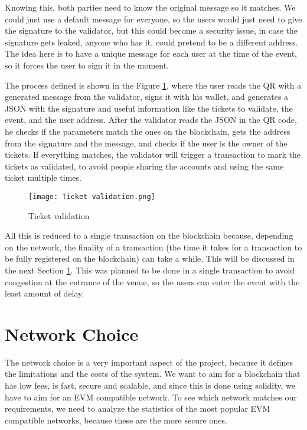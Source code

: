 Knowing this, both parties need to know the original message so it matches. We could just use a default message for everyone, so the users would just need to give the signature to the validator, but this could become a security issue, in case the signature gets leaked, anyone who has it, could pretend to be a different address. The idea here is to have a unique message for each user at the time of the event, so it forces the user to sign it in the moment.

The process defined is shown in the Figure \ref{fig:ticket_validation}, where the user reads the QR with a generated message from the validator, signs it with his wallet, and generates a JSON with the signature and useful information like the tickets to validate, the event, and the user address. After the validator reads the JSON in the QR code, he checks if the parameters match the ones on the blockchain, gets the address from the signature and the message, and checks if the user is the owner of the tickets. If everything matches, the validator will trigger a transaction to mark the tickets as validated, to avoid people sharing the accounts and using the same ticket multiple times.

\begin{figure}[H]
    \texttt{[image: Ticket validation.png]}
    \centering
    \caption{Ticket validation}
    \label{fig:ticket_validation}
\end{figure}

All this is reduced to a single transaction on the blockchain because, depending on the network, the finality of a transaction (the time it takes for a transaction to be fully registered on the blockchain) can take a while. This will be discussed in the next Section \ref{sec:network_choice}. This was planned to be done in a single transaction to avoid congestion at the entrance of the venue, so the users can enter the event with the least amount of delay.

\section{Network Choice}
\label{sec:network_choice}

The network choice is a very important aspect of the project, because it defines the limitations and the costs of the system. We want to aim for a blockchain that has low fees, is fast, secure and scalable, and since this is done using solidity, we have to aim for an EVM compatible network. To see which network matches our requirements, we need to analyze the statistics of the most popular EVM compatible networks, because these are the more secure ones.

